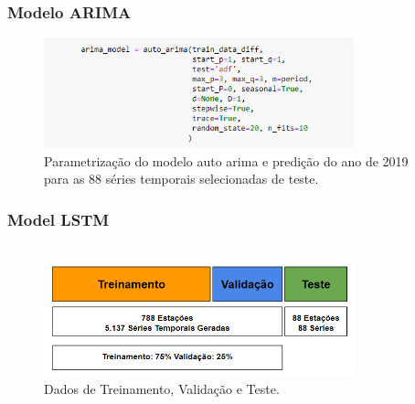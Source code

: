 \documentclass[aspectratio=169]{beamer}
\begin{document}
\begin{frame}
\frametitle{Modelo ARIMA}

\begin{figure}[H]
\centering
\caption{Parametrização do modelo auto arima e predição do ano de 2019 para as 88 séries temporais selecionadas de teste.}
\includegraphics[width=0.8\textwidth]{figuras/parametros_autoarima.png}
\end{figure}

\end{frame}


\begin{frame}
\frametitle{Model LSTM}

\begin{columns}



\begin{figure}[H]
\centering
\caption{Dados de Treinamento, Validação e Teste.}
\includegraphics[width=0.8\textwidth]{figuras/conjuntos_treinamento.png}
\end{figure}


\end{columns}

\end{frame}
\end{document}
